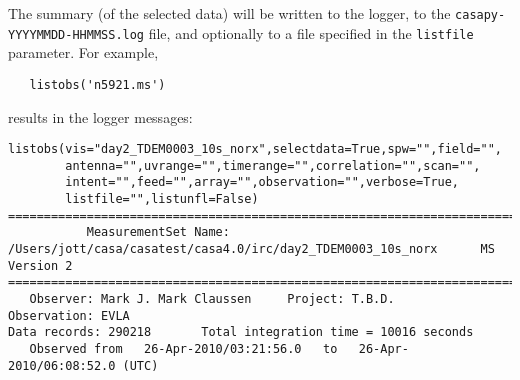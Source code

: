 The summary (of the selected data) will be written to the logger, to
the {\tt casapy-YYYYMMDD-HHMMSS.log} file, and optionally to a file
specified in the {\tt listfile} parameter.  For example, \small
\begin{verbatim}
   listobs('n5921.ms')
\end{verbatim}
\normalsize
results in the logger messages:
\small
\begin{verbatim}
listobs(vis="day2_TDEM0003_10s_norx",selectdata=True,spw="",field="",
        antenna="",uvrange="",timerange="",correlation="",scan="",
        intent="",feed="",array="",observation="",verbose=True,
        listfile="",listunfl=False)
================================================================================
           MeasurementSet Name:  /Users/jott/casa/casatest/casa4.0/irc/day2_TDEM0003_10s_norx      MS Version 2
================================================================================
   Observer: Mark J. Mark Claussen     Project: T.B.D.  
Observation: EVLA
Data records: 290218       Total integration time = 10016 seconds
   Observed from   26-Apr-2010/03:21:56.0   to   26-Apr-2010/06:08:52.0 (UTC)
   

\end{verbatim}
